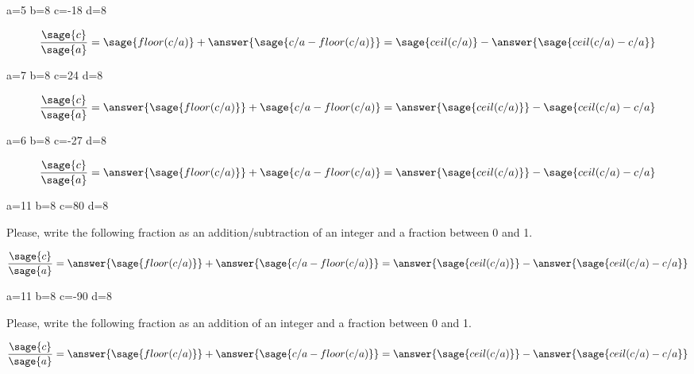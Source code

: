\documentclass{ximera}
\begin{document}
\begin{problem}
\begin{sagesilent}
a=5
b=8
c=-18
d=8
\end{sagesilent}
\begin{prompt}
$$\frac{\sage{c}}{\sage{a}}=\sage{floor(c/a)}+\answer{\sage{c/a-floor(c/a)}}=\sage{ceil(c/a)}-\answer{\sage{ceil(c/a)-c/a}} $$
\end{prompt}
\end{problem}


\begin{problem}
\begin{sagesilent}
a=7
b=8
c=24
d=8
\end{sagesilent}
\begin{prompt}
$$\frac{\sage{c}}{\sage{a}}=\answer{\sage{floor(c/a)}}+{\sage{c/a-floor(c/a)}}=\answer{\sage{ceil(c/a)}}-{\sage{ceil(c/a)-c/a}} $$
\end{prompt}
\end{problem}

\begin{problem}
\begin{sagesilent}
a=6
b=8
c=-27
d=8
\end{sagesilent}
\begin{prompt}
$$\frac{\sage{c}}{\sage{a}}=\answer{\sage{floor(c/a)}}+{\sage{c/a-floor(c/a)}}=\answer{\sage{ceil(c/a)}}-{\sage{ceil(c/a)-c/a}} $$
\end{prompt}
\end{problem}

\begin{problem}
\begin{sagesilent}
a=11
b=8
c=80
d=8
\end{sagesilent}
Please, write the following fraction as an addition/subtraction of an integer and a fraction between 0 and 1.
\begin{prompt}
$$\frac{\sage{c}}{\sage{a}}=\answer{\sage{floor(c/a)}}+\answer{\sage{c/a-floor(c/a)}}=\answer{\sage{ceil(c/a)}}-\answer{\sage{ceil(c/a)-c/a}} $$
\end{prompt}
\end{problem}


\begin{problem}
\begin{sagesilent}
a=11
b=8
c=-90
d=8
\end{sagesilent}
Please, write the following fraction as an addition of an integer and a fraction between 0 and 1.
\begin{prompt}
$$\frac{\sage{c}}{\sage{a}}=\answer{\sage{floor(c/a)}}+\answer{\sage{c/a-floor(c/a)}}=\answer{\sage{ceil(c/a)}}-\answer{\sage{ceil(c/a)-c/a}} $$
\end{prompt}
\end{problem}
\end{document}
